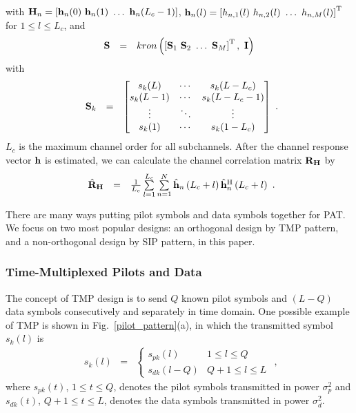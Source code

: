 \documentclass[conference]{IEEEtran}
\newcommand{\bh}{{\bf h}}
\newcommand{\bH}{{\bf H}}
\newcommand{\bS}{{\bf S}}
\newcommand{\bI}{{\bf I}}
\newcommand{\bR}{{\bf R}}
\begin{document}
\noindent with $\bH_{n}=\left[\bh_{n}(0)\ \bh_{n}(1)\ \ldots\
\bh_{n}(L_{c}-1)\right]$, $\bh_{n}(l)=\left[h_{n,1}(l)\
h_{n,2}(l)\ \ldots\ h_{n,M}(l)\right]^{\rm T}$ for $1\leq l \leq
L_{c}$, and
\begin{equation}%
\begin{array}{rcl}
\bS&=&\mbox{kron}\left(\left[\bS_{1}\ \bS_{2}\ \ldots\
\bS_{M}\right]^{\rm T},\ \bI\right)
\end{array}
\end{equation}
\noindent with
\begin{equation}%
\begin{array}{rcl}
\bS_{k}&=&\left[\begin{matrix}
s_{k}(L)&\cdots&s_{k}(L-L_{c})\\
s_{k}(L-1)&\cdots&s_{k}(L-L_{c}-1)\\
\vdots&\ddots&\vdots\\
s_{k}(1)&\cdots&s_{k}(1-L_{c})
\end{matrix}\right]
\end{array}.\label{S_k}
\end{equation}
\noindent $L_{c}$ is the maximum channel order for all
subchannels. After the channel response vector $\bh$ is estimated,
we can calculate the channel correlation matrix $\bR_{\bH}$ by
\begin{equation}%
\begin{array}{rcl}
\hat{\bR}_{\bH}&=&\frac{1}{L_{c}}\sum\limits_{l=1}^{L_{c}}\sum\limits_{n=1}^{N}\hat{\bh}_{n}\left(L_{c}+l\right)\hat{\bh}_{n}^{\rm
H}\left(L_{c}+l\right)
\end{array}.\label{R_h_actual}
\end{equation}

There are many ways putting pilot symbols and data symbols
together for PAT. We focus on two most popular designs: an
{orthogonal design} by {TMP pattern}, and a {non-orthogonal
design} by {SIP pattern}, in this paper.
\subsubsection{Time-Multiplexed Pilots and Data}
The concept of TMP design is to send $Q$ known pilot symbols and
$\left(L-Q\right)$ data symbols consecutively and separately in
time domain. One possible example of TMP is shown in
Fig.~\ref{pilot_pattern}(a), in which the transmitted symbol
$s_{k}(l)$ is
\begin{equation}
\begin{array}{rcl}
s_{k}\left(l\right)&=&
\begin{cases}
s_{pk}(l) & 1 \leq l \leq Q \\
s_{dk}(l-Q) & Q+1\leq l\leq L
\end{cases}
\end{array},\label{TMP_k}
\end{equation}
\noindent where $s_{pk}(t)$, $1\leq t \leq Q$, denotes the pilot
symbols transmitted in power $\sigma_{p}^2$ and $s_{dk}(t)$,
$Q+1\leq t \leq L$, denotes the data symbols transmitted in power
$\sigma_{d}^2$.
\end{document}
